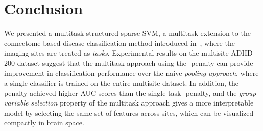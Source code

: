 \section{Conclusion}\vspace{-4pt}
We presented a multitask structured sparse SVM, a multitask extension to the connectome-based disease classification method introduced in~\cite{Watanabe:2014}, where the imaging sites are treated as \emph{tasks}.
Experimental results on the multisite \mbox{ADHD-200} dataset suggest that the multitask approach using the \MTL-penalty can provide improvement in classification performance over the naive \emph{pooling approach}, where a single classifier is trained on the entire multisite dataset. %
In addition, the \MTL-penalty achieved higher AUC scores than the single-task \STL-penalty, and the \emph{group variable selection} property of the multitask approach gives a more interpretable model by selecting the same set of features across sites, which can be visualized compactly in brain space.  
